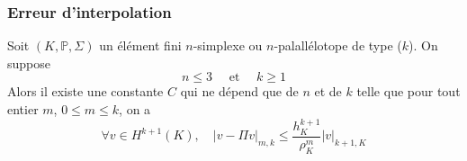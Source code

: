 \documentclass{beamer}
\begin{document}
\begin{frame}
\frametitle{Erreur d'interpolation}
Soit $(K,\mathbb{P},\Sigma)$ un élément fini $n$-simplexe ou $n$-palallélotope de type ($k$). On suppose
\[n\leq 3\quad \mbox{ et }\quad k\geq 1\]
Alors il existe une constante $C$ qui ne dépend que de $n$ et de $k$ telle que pour tout entier $m$, $0\leq m\leq k$, on a
\[\forall v\in H^{k+1}(K),\quad |v-\Pi v|_{m,k}\leq \frac{h_K^{k+1}}{\rho_K^m}|v|_{k+1,K}\]
\begin{center}
\end{center}
 
\end{frame}
\end{document}
